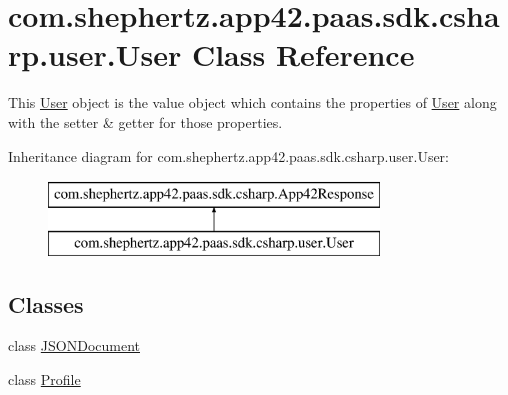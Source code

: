 \hypertarget{classcom_1_1shephertz_1_1app42_1_1paas_1_1sdk_1_1csharp_1_1user_1_1_user}{\section{com.\+shephertz.\+app42.\+paas.\+sdk.\+csharp.\+user.\+User Class Reference}
\label{classcom_1_1shephertz_1_1app42_1_1paas_1_1sdk_1_1csharp_1_1user_1_1_user}
}


This \hyperlink{classcom_1_1shephertz_1_1app42_1_1paas_1_1sdk_1_1csharp_1_1user_1_1_user}{User} object is the value object which contains the properties of \hyperlink{classcom_1_1shephertz_1_1app42_1_1paas_1_1sdk_1_1csharp_1_1user_1_1_user}{User} along with the setter \& getter for those properties.  


Inheritance diagram for com.\+shephertz.\+app42.\+paas.\+sdk.\+csharp.\+user.\+User\+:\begin{figure}[H]
\begin{center}
\leavevmode
\includegraphics[height=2.000000cm]{classcom_1_1shephertz_1_1app42_1_1paas_1_1sdk_1_1csharp_1_1user_1_1_user}
\end{center}
\end{figure}
\subsection*{Classes}
\begin{DoxyCompactItemize}
\item 
class \hyperlink{classcom_1_1shephertz_1_1app42_1_1paas_1_1sdk_1_1csharp_1_1user_1_1_user_1_1_j_s_o_n_document}{J\+S\+O\+N\+Document}
\item 
class \hyperlink{classcom_1_1shephertz_1_1app42_1_1paas_1_1sdk_1_1csharp_1_1user_1_1_user_1_1_profile}{Profile}
\end{DoxyCompactItemize}
